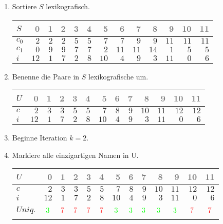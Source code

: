 \begin{enumerate}
\item 
Sortiere $S$ lexikografisch.
\begin{center}
\small\begin{tabular}{lrrrrrrrrrrrr}
    \toprule 
    $S$ & \textcolor{gray}{0} & \textcolor{gray}{1} & \textcolor{gray}{2} & \textcolor{gray}{3} & \textcolor{gray}{4} & \textcolor{gray}{5} & \textcolor{gray}{6} & \textcolor{gray}{7} & \textcolor{gray}{8} & \textcolor{gray}{9} & \textcolor{gray}{10} & \textcolor{gray}{11}\\
    \midrule 
    $c_0$ & $2$ & $2$ & $2$ & $5$ & $5$ & $7$ & $7$ & $9$ & $9$ & $11$ & $11$ & $11$ \\
    $c_1$ & $0$ & $9$ & $9$ & $7$ & $7$ & $2$ & $11$ & $11$ & $14$ & $1$ & $5$ & $5$ \\
    $i$ & $12$ & $1$ & $7$ & $2$ & $8$ & $10$ & $4$ & $9$ & $3$ & $11$ & $0$ & $6$ \\
    \bottomrule 
\end{tabular}
\end{center}

\item 
Benenne die Paare in $S$ lexikografische um.
\begin{center}
\small\begin{tabular}{lrrrrrrrrrrrr}
    \toprule 
    $U$ & \textcolor{gray}{0} & \textcolor{gray}{1} & \textcolor{gray}{2} & \textcolor{gray}{3} & \textcolor{gray}{4} & \textcolor{gray}{5} & \textcolor{gray}{6} & \textcolor{gray}{7} & \textcolor{gray}{8} & \textcolor{gray}{9} & \textcolor{gray}{10} & \textcolor{gray}{11}\\
    \midrule 
    $c$ & $2$ & $3$ & $3$ & $5$ & $5$ & $7$ & $8$ & $9$ & $10$ & $11$ & $12$ & $12$ \\
    $i$ & $12$ & $1$ & $7$ & $2$ & $8$ & $10$ & $4$ & $9$ & $3$ & $11$ & $0$ & $6$ \\
    \bottomrule 
\end{tabular}
\end{center}
\item 
Beginne Iteration $k = 2$.

\item 
Markiere alle einzigartigen Namen in U.
\begin{center}
\small\begin{tabular}{lrrrrrrrrrrrr}
    \toprule 
    $U$ & \textcolor{gray}{0} & \textcolor{gray}{1} & \textcolor{gray}{2} & \textcolor{gray}{3} & \textcolor{gray}{4} & \textcolor{gray}{5} & \textcolor{gray}{6} & \textcolor{gray}{7} & \textcolor{gray}{8} & \textcolor{gray}{9} & \textcolor{gray}{10} & \textcolor{gray}{11}\\
    \midrule 
    $c$ & $2$ & $3$ & $3$ & $5$ & $5$ & $7$ & $8$ & $9$ & $10$ & $11$ & $12$ & $12$ \\
    $i$ & $12$ & $1$ & $7$ & $2$ & $8$ & $10$ & $4$ & $9$ & $3$ & $11$ & $0$ & $6$ \\
    $Uniq.$ & $$\cmarkc$$ & $$\xmarkc$$ & $$\xmarkc$$ & $$\xmarkc$$ & $$\xmarkc$$ & $$\cmarkc$$ & $$\cmarkc$$ & $$\cmarkc$$ & $$\cmarkc$$ & $$\cmarkc$$ & $$\xmarkc$$ & $$\xmarkc$$ \\
    \bottomrule 
\end{tabular}
\end{center}


\end{enumerate}
